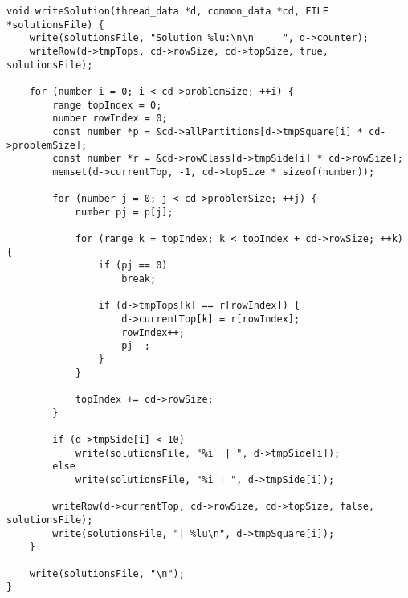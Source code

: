 \begin{lstlisting}[caption={Writing an entire solution.},label={writeSolution}]
void writeSolution(thread_data *d, common_data *cd, FILE *solutionsFile) {
    write(solutionsFile, "Solution %lu:\n\n     ", d->counter);
    writeRow(d->tmpTops, cd->rowSize, cd->topSize, true, solutionsFile);

    for (number i = 0; i < cd->problemSize; ++i) {
        range topIndex = 0;
        number rowIndex = 0;
        const number *p = &cd->allPartitions[d->tmpSquare[i] * cd->problemSize];
        const number *r = &cd->rowClass[d->tmpSide[i] * cd->rowSize];
        memset(d->currentTop, -1, cd->topSize * sizeof(number));

        for (number j = 0; j < cd->problemSize; ++j) {
            number pj = p[j];

            for (range k = topIndex; k < topIndex + cd->rowSize; ++k) {
                if (pj == 0)
                    break;

                if (d->tmpTops[k] == r[rowIndex]) {
                    d->currentTop[k] = r[rowIndex];
                    rowIndex++;
                    pj--;
                }
            }

            topIndex += cd->rowSize;
        }

        if (d->tmpSide[i] < 10)
            write(solutionsFile, "%i  | ", d->tmpSide[i]);
        else
            write(solutionsFile, "%i | ", d->tmpSide[i]);

        writeRow(d->currentTop, cd->rowSize, cd->topSize, false, solutionsFile);
        write(solutionsFile, "| %lu\n", d->tmpSquare[i]);
    }

    write(solutionsFile, "\n");
}
\end{lstlisting}

